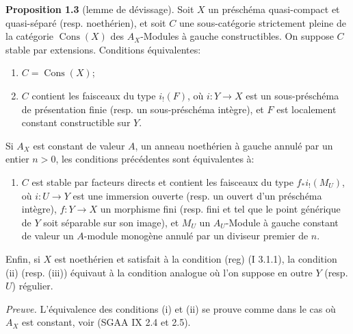 \documentclass[11pt]{article}
\providecommand{\Cons}{\operatorname{Cons}}
\begin{document}
\textbf{Proposition 1.3} (lemme de dévissage). Soit $X$ un préschéma quasi-compact et quasi-séparé (resp. noethérien), et soit $C$ une sous-catégorie strictement pleine de la catégorie $\Cons(X)$ des $A_X$-Modules à gauche constructibles. On suppose $C$ stable par extensions. Conditions équivalentes:
\begin{enumerate}[label=(\roman*)]
\item $C=\Cons(X)$;
\item $C$ contient les faisceaux du type $i_!(F)$, où $i:Y\to X$ est un sous-préschéma de présentation finie (resp. un sous-préschéma intègre), et $F$ est localement constant constructible sur $Y$.
\end{enumerate}
Si $A_X$ est constant de valeur $A$, un anneau noethérien à gauche annulé par un entier $n>0$, les conditions précédentes sont équivalentes à:
\begin{enumerate}[label=(\roman*),start=3]
\item $C$ est stable par facteurs directs et contient les faisceaux du type $f_*i_!(M_U)$, où $i:U\to Y$ est une immersion ouverte (resp. un ouvert d'un préschéma intègre), $f:Y\to X$ un morphisme fini (resp. fini et tel que le point générique de $Y$ soit séparable sur son image), et $M_U$ un $A_U$-Module à gauche constant de valeur un $A$-module monogène annulé par un diviseur premier de $n$.
\end{enumerate}
Enfin, si $X$ est noethérien et satisfait à la condition (reg) (I 3.1.1), la condition (ii) (resp. (iii)) équivaut à la condition analogue où l'on suppose en outre $Y$ (resp. $U$) régulier.

\emph{Preuve.} L'équivalence des conditions (i) et (ii) se prouve comme dans le cas où $A_X$ est constant, voir (SGAA IX 2.4 et 2.5).
\end{document}
